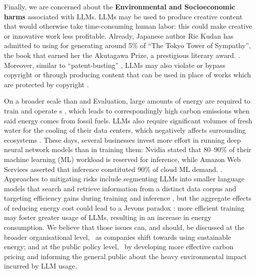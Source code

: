 Finally, we are concerned about the \textbf{Environmental and Socioeconomic harms} associated with LLMs. LLMs may be used to produce creative content that would otherwise take time-consuming human labor: this could make creative or innovative work less profitable. Already, Japanese author Rie Kudan has admitted to using {\chatgpt} for generating around 5\% of ``The Tokyo Tower of Sympathy'', the book that earned her the Akutagawa Prize, a prestigious literary award. \citep{choi2024winner}. Moreover, similar to ``patent-busting'' \citep{rimmer2016patent}, LLMs may also violate or bypass copyright or through producing content that can be used in place of works which are protected by copyright \citep{karamolegkou-etal-2023-copyright}.

On a broader scale than {\asgfull} and Evaluation, large amounts of energy are required to train and operate {\llm}s \citep{bender2021dangers}, which leads to correspondingly high carbon emissions when said energy comes from fossil fuels. LLMs also require significant volumes of fresh water for the cooling of their data centers, which negatively affects surrounding ecosystems \citep{myttonDataCentreWater2021}. These days, several businesses invest more effort in running deep neural network models than in training them: Nvidia stated that 80–90\% of their machine learning (ML) workload is reserved for inference, while Amazon Web Services asserted that inference constituted 90\% of cloud ML demand. \citep{patterson2021carbon}. Approaches to mitigating risks include segmenting LLMs into smaller language models that search and retrieve information from a distinct data corpus \citep{borgeaud2022improving} and targeting efficiency gains during training and inference \citep{li2021terapipe}, but the aggregate effects of reducing energy cost could lead to a Jevons paradox \citep{jevons1866coal}: more efficient training may foster greater usage of LLMs, resulting in an increase in energy consumption. We believe that those issues can, and should, be discussed at the broader organisational level, {\eg}\ as companies shift towards using sustainable energy; and at the public policy level, {\eg}\ by developing more effective carbon pricing and informing the general public about the heavy environmental impact incurred by LLM usage.

